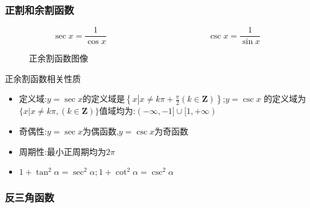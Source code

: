 \documentclass[8pt a4paper, oneside, UTF8]{ctexbook}  %
\begin{document}
\begin{sloppypar}
    \subsubsection{正割和余割函数}
    $$
        \boxed{\sec x=\frac{1}{\cos x}}
        \qquad  \qquad \qquad \qquad \qquad \qquad
        \boxed{\csc x=\frac{1}{\sin x}}
    $$
    \begin{figure}[H] \centering
        \caption{正余割函数图像}
    \end{figure}
    \begin{criterion}{正余割函数相关性质}{}
        \begin{itemize}
            \item 定义域:$y=\sec x$的定义域是$\left\{x\left|x\neq k\pi+\frac{\pi}{2}\left(k\in\mathbf{Z}\right)\right\}\right.$;$y=\csc x$ 的定义域为$\{x|x\neq k\pi,(k \in \mathbf{Z})\}$值域均为:$(-\infty,-1]\cup[1,+\infty)$
            \item 奇偶性:$y=\sec x$为偶函数,$y=\csc x$为奇函数
            \item 周期性:最小正周期均为$ 2\pi$
            \item $1+\tan^{2}\alpha=\sec^{2}\alpha;1+\cot^{2}\alpha=\csc^{2}\alpha $
        \end{itemize}
    \end{criterion}
    \subsubsection{反三角函数}

\end{sloppypar}
\end{document}
